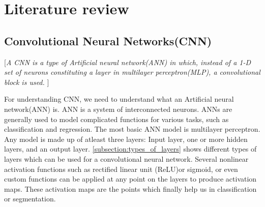 \chapter{Literature review}\label{chapt:lit}
\section{Convolutional Neural Networks(CNN)}
[\textit{A CNN is a type of Artificial neural network(ANN) in which, instead of a 1-D set of neurons constituting a layer in multilayer perceptron(MLP), a convolutional block is used. }]

For understanding CNN, we need to understand what an Artificial neural network(ANN) is. ANN is a system of interconnected neurons. ANNs are generally used to model complicated functions for various tasks, such as classification and regression. The most basic ANN model is multilayer perceptron. Any model is made up of atleast three layers: Input layer, one or more hidden layers, and an output layer. \ref{subsection:types_of_layers} shows different types of layers which can be used for a convolutional neural network. Several nonlinear activation functions such as rectified linear unit (ReLU)or sigmoid, or even custom functions can be applied at any point on the layers to produce activation maps. These activation maps are the points which finally help us in classification or segmentation.

